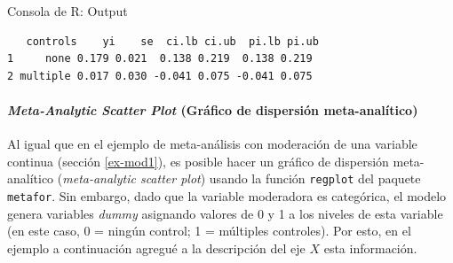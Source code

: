 \documentclass[
  bookmarksnumbered]{article}
\newenvironment{Shaded}{\begin{snugshade}}{\end{snugshade}}
\newcommand{\AttributeTok}[1]{\textcolor[rgb]{0.00,0.34,0.68}{#1}}
\newcommand{\DecValTok}[1]{\textcolor[rgb]{0.69,0.50,0.00}{#1}}
\newcommand{\FunctionTok}[1]{\textcolor[rgb]{0.39,0.29,0.61}{#1}}
\newcommand{\NormalTok}[1]{\textcolor[rgb]{0.12,0.11,0.11}{#1}}
\newcommand{\OtherTok}[1]{\textcolor[rgb]{0.00,0.43,0.16}{#1}}
\newcommand{\SpecialCharTok}[1]{\textcolor[rgb]{0.24,0.68,0.91}{#1}}
\begin{document}
\begin{Shaded}
\end{Shaded}

\begin{ROut}{Consola de R: Output~\thetcbcounter}
                \begin{footnotesize}
                \begin{verbatim}   controls    yi    se  ci.lb ci.ub  pi.lb pi.ub
1     none 0.179 0.021  0.138 0.219  0.138 0.219
2 multiple 0.017 0.030 -0.041 0.075 -0.041 0.075
 \end{verbatim}
                \end{footnotesize}
                \end{ROut}

\hypertarget{meta-scatter2}{%
\paragraph{\texorpdfstring{\emph{Meta-Analytic Scatter Plot} (Gráfico de dispersión meta-analítico)}{Meta-Analytic Scatter Plot (Gráfico de dispersión meta-analítico)}}\label{meta-scatter2}}

Al igual que en el ejemplo de meta-análisis con moderación de una variable continua (sección \ref{ex-mod1}), es posible hacer un gráfico de dispersión meta-analítico (\emph{meta-analytic scatter plot}) usando la función \texttt{regplot} del paquete \texttt{metafor}. Sin embargo, dado que la variable moderadora es categórica, el modelo genera variables \emph{dummy} asignando valores de 0 y 1 a los niveles de esta variable (en este caso, 0 = ningún control; 1 = múltiples controles). Por esto, en el ejemplo a continuación agregué a la descripción del eje \(X\) esta información.
\end{document}
